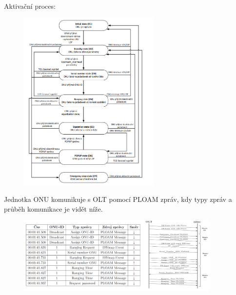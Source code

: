 Aktivační proces:
\begin{figure} [h]
    \centering
    \includegraphics[width=0.63\textwidth]{snimky/proces.png}
    \label{fig:gpon-proces}
\end{figure}


Jednotka ONU komunikuje s OLT pomocí PLOAM zpráv, kdy typy zpráv a průběh komunikace je vidět níže.

\begin{figure} [h]
    \centering
    \includegraphics[width=0.9\textwidth]{snimky/aktivaceONU.png}
\end{figure}



